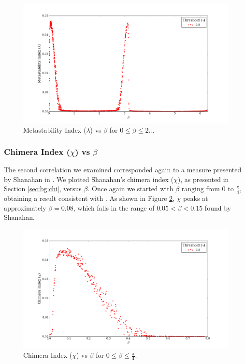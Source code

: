 \documentclass[a4paper,11pt]{article}
\begin{document}
\begin{figure}[H]
\begin{center}
\includegraphics[scale = 0.35]{figures/lambda_vs_beta_ext}
\end{center}
\caption{
	Metastability Index ($\lambda$) vs $\beta$ for $0 \leq \beta \leq 2\pi$.
	\label{fig:lambda-vs-beta-ext}
}
\end{figure}

\subsubsection{Chimera Index ($\chi$) vs $\beta$}
\label{sec:app:osc:res:chi-v-beta}

The second correlation we examined corresponded again to a measure presented by Shanahan in \cite{Shanahan2010}. We plotted Shanahan's chimera index ($\chi$), as presented in Section \ref{sec:bg:chi}, versus $\beta$. Once again we started with $\beta$ ranging from $0$ to $\frac{\pi}{4}$, obtaining a result consistent with \cite{Shanahan2010}. As shown in Figure \ref{fig:chi-vs-beta-orig}, $\chi$ peaks at approximately $\beta = 0.08$, which falls in the range of $0.05 < \beta < 0.15$ found by Shanahan.

\begin{figure}[H]
\begin{center}
\includegraphics[scale = 0.35]{figures/chi_vs_beta_orig}
\end{center}
\caption{
	Chimera Index ($\chi$) vs $\beta$ for $0 \leq \beta \leq \frac{\pi}{4}$.
	\label{fig:chi-vs-beta-orig}
}
\end{figure}
\end{document}
